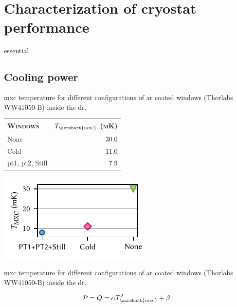 \chapter{Characterization of cryostat performance}\label{ch:setup:cooling}
 essential

\section{Cooling power}\label{sec:setup:cooling:power}

\begin{margintable}
    \centering
    \footnotesize
    \caption{
        \Acrlong{mxc} temperature for different configurations of \gls{ar} coated windows (Thorlabs WW41050-B) inside the \gls{dr}.
    }
    \label{tab:setup:cooling:windows}
    \begin{tabular}{lr}
        \toprule
        \textsc{Windows}                      & $T_\mathrm{\acrshort{mxc}}$ \textsc{(mK)} \\
        \midrule
        None                                  & 30.0                                      \\
        Cold                                  & 11.0                                      \\
        \acrshort{pt1}, \acrshort{pt2}, Still & 7.9                                       \\
        \bottomrule
    \end{tabular}
\end{margintable}

\begin{marginfigure}
    \centering
    \includegraphics{img/pdf/setup/window_heating}
    \caption[]{
        \Acrlong{mxc} temperature for different configurations of \gls{ar} coated windows (Thorlabs WW41050-B) inside the \gls{dr}.
    }
    \label{fig:setup:cooling:windows}
\end{marginfigure}

\begin{equation}\label{eq:setup:cooling:dr_power}
    P = \dot{Q} = \alpha T_{\mr{\acrshort{mxc}}}^2 + \beta
\end{equation}

